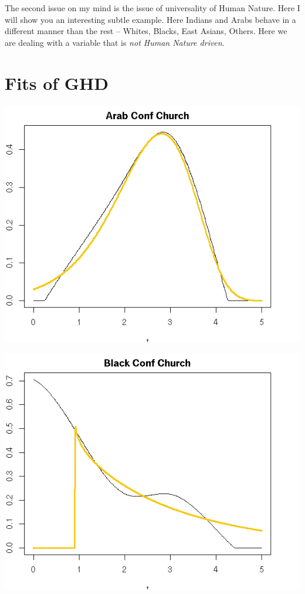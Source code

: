\documentclass{amsart}
\begin{document}
The second issue on my mind is the issue of universality of Human Nature.  Here I will show you an interesting subtle example.  Here Indians and Arabs behave in a different manner than the rest -- Whites, Blacks, East Asians, Others.  Here we are dealing with a variable that is {\em not Human Nature driven}.  

\section{Fits of GHD}

\includegraphics[scale=0.8]{cfchurch_arab.png}

\includegraphics[scale=0.8]{cfchurch_black.png}
\end{document}
